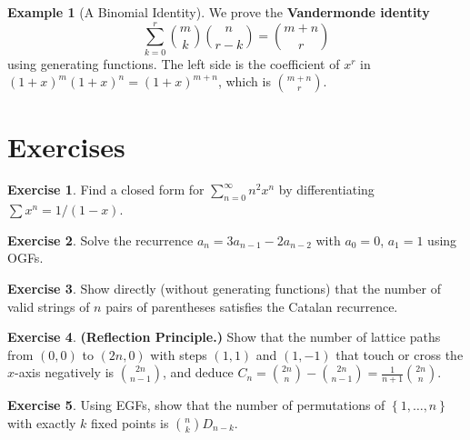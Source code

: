\documentclass[12pt,a4paper,openany]{book}
\theoremstyle{definition}
\newtheorem{example}[definition]{Example}
\newtheorem{exercise}{Exercise}[chapter]
\theoremstyle{plain}
\theoremstyle{remark}
\newcommand{\set}[1]{\left\{#1\right\}}
\begin{document}
\begin{example}[A Binomial Identity]\label{ex:snake-oil}
We prove the \textbf{Vandermonde identity}
\[
  \sum_{k=0}^{r}\binom{m}{k}\binom{n}{r-k} = \binom{m+n}{r}
\]
using generating functions.  The left side is the coefficient of $x^r$
in $(1+x)^m(1+x)^n = (1+x)^{m+n}$, which is $\binom{m+n}{r}$.
\end{example}



\section{Exercises}\label{sec:gf-exercises}

\begin{exercise}\label{exo:ogf-tower}
Find a closed form for $\sum_{n=0}^{\infty}n^2 x^n$ by
differentiating $\sum x^n = 1/(1-x)$.
\end{exercise}

\begin{exercise}\label{exo:ogf-recurrence-1}
Solve the recurrence $a_n = 3a_{n-1} - 2a_{n-2}$ with $a_0=0$,
$a_1=1$ using OGFs.
\end{exercise}

\begin{exercise}\label{exo:catalan-parentheses}
Show directly (without generating functions) that the number of valid
strings of $n$ pairs of parentheses satisfies the Catalan recurrence.
\end{exercise}

\begin{exercise}\label{exo:catalan-reflection}
\textbf{(Reflection Principle.)}
Show that the number of lattice paths from $(0,0)$ to $(2n,0)$ with
steps $(1,1)$ and $(1,-1)$ that touch or cross the $x$-axis negatively
is $\binom{2n}{n-1}$, and deduce $C_n = \binom{2n}{n}-\binom{2n}{n-1}
= \frac{1}{n+1}\binom{2n}{n}$.
\end{exercise}

\begin{exercise}\label{exo:egf-fixed-points}
Using EGFs, show that the number of permutations of $\set{1,\dots,n}$
with exactly $k$ fixed points is $\binom{n}{k}D_{n-k}$.
\end{exercise}
\end{document}
